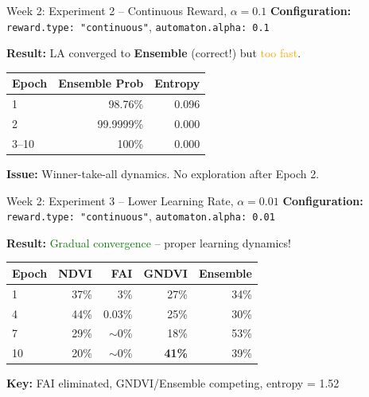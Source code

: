 \documentclass[10pt,xcolor={table,dvipsnames},t]{beamer}
\begin{document}
\begin{frame}{Week 2: Experiment 2 -- Continuous Reward, $\alpha=0.1$}
\small
\textbf{Configuration:} \texttt{reward.type: "continuous"}, \texttt{automaton.alpha: 0.1}

\vspace{0.3em}
\textbf{Result:} LA converged to \textbf{Ensemble} (correct!) but \textcolor{orange}{too fast}.

\vspace{0.3em}
\begin{table}
\centering
\footnotesize
\begin{tabular}{lrr}
\toprule
\textbf{Epoch} & \textbf{Ensemble Prob} & \textbf{Entropy} \\
\midrule
1 & 98.76\% & 0.096 \\
2 & 99.9999\% & 0.000 \\
3--10 & 100\% & 0.000 \\
\bottomrule
\end{tabular}
\end{table}

\vspace{0.3em}
\textbf{Issue:} Winner-take-all dynamics. No exploration after Epoch 2.

\end{frame}

\begin{frame}{Week 2: Experiment 3 -- Lower Learning Rate, $\alpha=0.01$}
\small
\textbf{Configuration:} \texttt{reward.type: "continuous"}, \texttt{automaton.alpha: 0.01}

\vspace{0.2em}
\textbf{Result:} \textcolor{green}{Gradual convergence} -- proper learning dynamics!

\vspace{0.2em}
\begin{table}
\centering
\footnotesize
\begin{tabular}{lrrrr}
\toprule
\textbf{Epoch} & \textbf{NDVI} & \textbf{FAI} & \textbf{GNDVI} & \textbf{Ensemble} \\
\midrule
1 & 37\% & 3\% & 27\% & 34\% \\
4 & 44\% & 0.03\% & 25\% & 30\% \\
7 & 29\% & $\sim$0\% & 18\% & 53\% \\
10 & 20\% & $\sim$0\% & \textbf{41\%} & 39\% \\
\bottomrule
\end{tabular}
\end{table}

\vspace{0.2em}
\textbf{Key:} FAI eliminated, GNDVI/Ensemble competing, entropy = 1.52

\end{frame}
\end{document}
